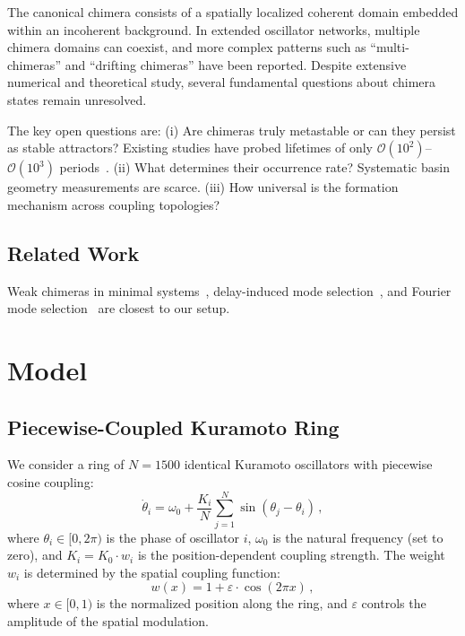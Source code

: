 \documentclass[12pt]{article}
\newcommand{\eps}{\varepsilon}
\newcommand{\thetasym}{\theta}
\newcommand{\omegasym}{\omega}
\newcommand{\Dtheta}{\dot{\theta}}
\begin{document}
The canonical chimera consists of a spatially localized coherent domain embedded within an incoherent background. In extended oscillator networks, multiple chimera domains can coexist, and more complex patterns such as ``multi-chimeras'' and ``drifting chimeras'' have been reported. Despite extensive numerical and theoretical study, several fundamental questions about chimera states remain unresolved.

The key open questions are: (i) Are chimeras truly metastable or can they persist as stable attractors? Existing studies have probed lifetimes of only $\mathcal{O}(10^2)$--$\mathcal{O}(10^3)$ periods~\cite{butzinski2023}. (ii) What determines their occurrence rate? Systematic basin geometry measurements are scarce. (iii) How universal is the formation mechanism across coupling topologies?

\subsection{Related Work}
Weak chimeras in minimal systems~\cite{ashwin2024}, delay-induced mode selection~\cite{wu2026}, and Fourier mode selection~\cite{bhatt2025} are closest to our setup.

\section{Model}\label{sec:model}

\subsection{Piecewise-Coupled Kuramoto Ring}

We consider a ring of $N = 1500$ identical Kuramoto oscillators with piecewise cosine coupling:
\begin{equation}
\Dtheta_i = \omegasym_0 + \frac{K_i}{N} \sum_{j=1}^{N} \sin(\thetasym_j - \thetasym_i)\,,
\label{eq:kuramoto}
\end{equation}
where $\thetasym_i \in [0, 2\pi)$ is the phase of oscillator $i$, $\omegasym_0$ is the natural frequency (set to zero), and $K_i = K_0 \cdot w_i$ is the position-dependent coupling strength. The weight $w_i$ is determined by the spatial coupling function:
\begin{equation}
w(x) = 1 + \eps \cdot \cos(2\pi x)\,,
\label{eq:coupling}
\end{equation}
where $x \in [0, 1)$ is the normalized position along the ring, and $\eps$ controls the amplitude of the spatial modulation.
\end{document}
